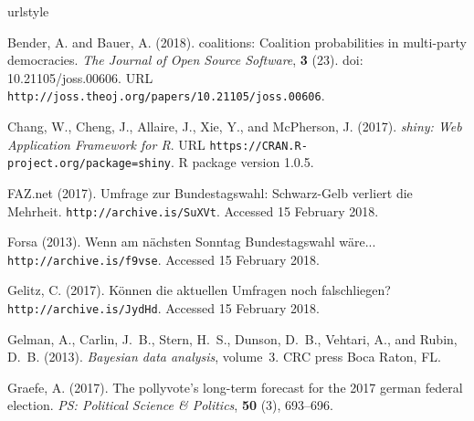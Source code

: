 \documentclass[smallextended]{svjour3}      %
\begin{document}

\begin{thebibliography}{13}
\providecommand{\natexlab}[1]{#1}
\providecommand{\url}[1]{\texttt{#1}}
\expandafter\ifx\csname urlstyle\endcsname\relax
  \providecommand{\doi}[1]{doi: #1}\else
  \providecommand{\doi}{doi: \begingroup \urlstyle{rm}\Url}\fi

{\rm Bender, A. {\rm and} Bauer, A.} (2018).
\newblock coalitions: Coalition probabilities in multi-party democracies.
\newblock \emph{The Journal of Open Source Software}, {\bf 3} (23).
\newblock \doi{10.21105/joss.00606}.
\newblock URL \url{http://joss.theoj.org/papers/10.21105/joss.00606}.

{\rm Chang, W., Cheng, J., Allaire, J., Xie, Y., {\rm and} McPherson, J.}
  (2017).
\newblock \emph{shiny: Web Application Framework for R}.
\newblock URL \url{https://CRAN.R-project.org/package=shiny}.
\newblock R package version 1.0.5.

{\rm FAZ.net} (2017).
\newblock Umfrage zur {B}undestagswahl: {S}chwarz-{G}elb verliert die
  {M}ehrheit.
\newblock \url{http://archive.is/SuXVt}.
\newblock Accessed 15 February 2018.

{\rm Forsa} (2013).
\newblock Wenn am n\"{a}chsten {S}onntag {B}undestagswahl w\"{a}re...
\newblock \url{http://archive.is/f9vse}.
\newblock Accessed 15 February 2018.

{\rm Gelitz, C.} (2017).
\newblock K\"{o}nnen die aktuellen {U}mfragen noch falsch\-liegen?
\newblock \url{http://archive.is/JydHd}.
\newblock Accessed 15 February 2018.

{\rm Gelman, A., Carlin, J.~B., Stern, H.~S., Dunson, D.~B., Vehtari, A., {\rm
  and} Rubin, D.~B.} (2013).
\newblock \emph{Bayesian data analysis}, volume~3.
\newblock CRC press Boca Raton, FL.

{\rm Graefe, A.} (2017).
\newblock The pollyvote’s long-term forecast for the 2017 german federal
  election.
\newblock \emph{PS: Political Science \& Politics}, {\bf 50} (3),
   693--696.


\end{thebibliography}
\end{document}
